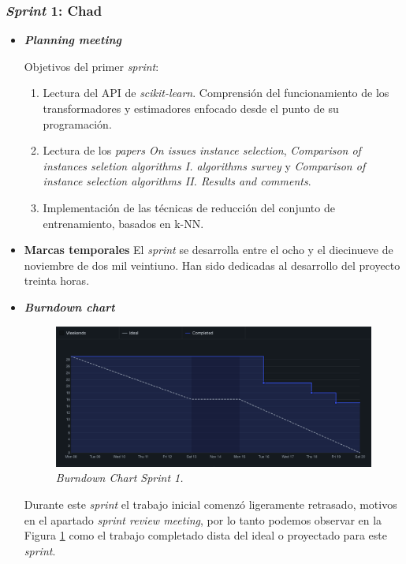 \subsubsection{\textit{Sprint} 1: Chad}
\begin{itemize}
\item \textbf{\textit{Planning meeting}}

Objetivos del primer \textit{sprint}:
\begin{enumerate}
\item Lectura del API de \textit{scikit-learn}. Comprensión del funcionamiento de los transformadores y estimadores enfocado desde el punto de su programación.
\item Lectura de los \textit{papers On issues instance selection}\cite{liu2002issues}, \textit{Comparison of instances seletion algorithms I. algorithms survey}\cite{jankowski2004comparison} y \textit{Comparison of instance selection algorithms II. Results and comments}\cite{grochowski2004comparison}.
\item Implementación de las técnicas de reducción del conjunto de entrenamiento, basados en k-NN.
\end{enumerate}

\item \textbf{Marcas temporales}
El \textit{sprint} se desarrolla entre el ocho y el diecinueve de noviembre de dos mil veintiuno. Han sido dedicadas al desarrollo del proyecto treinta horas.

\item \textbf{\textit{Burndown chart}}
\begin{figure}
\begin{center}
\includegraphics[width=\textwidth]{../img/anexos/sprints/BD-Sprint1}
\caption{\textit{Burndown Chart Sprint 1.}}\label{fig:BD-Sprint1}
\end{center}
\end{figure}
Durante este \textit{sprint} el trabajo inicial comenzó ligeramente retrasado, motivos en el apartado \textit{sprint review meeting}, por lo tanto podemos observar en la Figura \ref{fig:BD-Sprint1} como el trabajo completado dista del ideal o proyectado para este \textit{sprint}.


\end{itemize}
